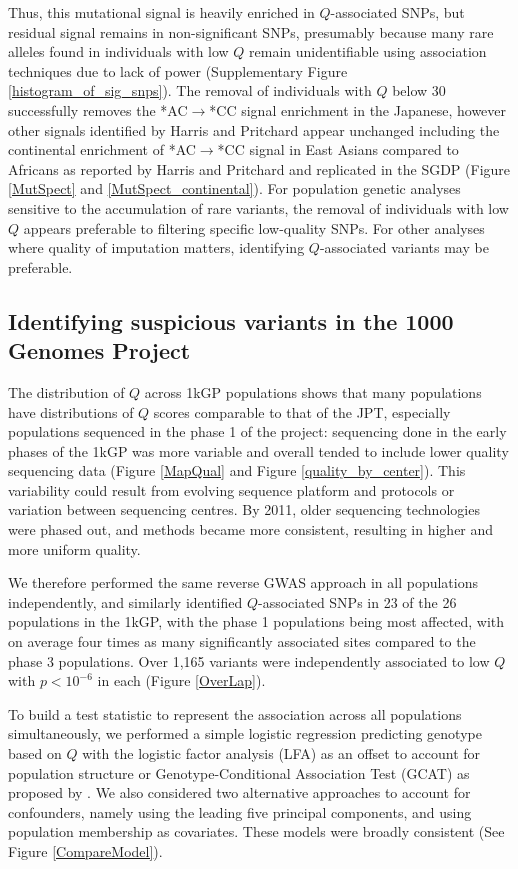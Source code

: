 \documentclass[9pt,article]{template}
\begin{document}
Thus, this mutational signal is heavily enriched in $Q$-associated SNPs, but residual signal remains in non-significant SNPs, presumably because many rare alleles found in individuals with low $Q$ remain unidentifiable using association techniques due to lack of power (Supplementary Figure \ref{histogram_of_sig_snps}).
The removal of individuals with $Q$ below 30 successfully removes the *AC${\rightarrow}$*CC signal enrichment in the Japanese, however other signals identified by Harris and Pritchard appear unchanged including the continental enrichment of *AC${\rightarrow}$*CC signal in East Asians compared to Africans as reported by Harris and Pritchard and replicated in the SGDP (Figure \ref{MutSpect} and \ref{MutSpect_continental}).
For population genetic analyses sensitive to the accumulation of rare variants, the removal of individuals with low $Q$ appears preferable to filtering specific low-quality SNPs. 
For other analyses where quality of imputation matters, identifying $Q$-associated variants may be preferable. 

\subsection{Identifying suspicious variants in the 1000 Genomes Project}
The distribution of $Q$ across 1kGP populations shows that many populations have distributions of $Q$ scores comparable to that of the JPT, especially populations sequenced in the phase 1 of the project: sequencing done in the early phases of the 1kGP was more variable and overall tended to include lower quality sequencing data (Figure \ref{MapQual} and Figure \ref{quality_by_center}).
This variability could result from evolving sequence platform and protocols or variation between sequencing centres. 
By 2011, older sequencing technologies were phased out, and methods became more consistent, resulting in higher and more uniform quality.

We therefore performed the same reverse GWAS approach in all populations independently, and similarly identified $Q$-associated SNPs in 23 of the 26 populations in the 1kGP, with the phase 1 populations being most affected, with on average four times as many significantly associated sites compared to the phase 3 populations.
Over 1,165 variants were independently associated to low $Q$ with $ p < 10^{-6}$ in each (Figure \ref{OverLap}).

To build a test statistic to represent the association across all populations simultaneously, we performed a simple logistic regression predicting genotype based on $Q$ with the logistic factor analysis (LFA) as an offset to account for population structure or Genotype-Conditional Association Test  (GCAT) as proposed by \citep{song2015testing}. 
We also considered two alternative approaches to account for confounders, namely using the leading five  principal components, and using population membership as covariates. 
These models were broadly consistent (See Figure \ref{CompareModel}).
\end{document}
